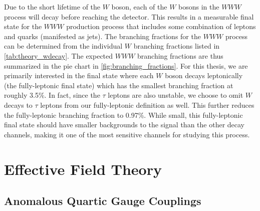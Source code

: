 Due to the short lifetime of the $W$ boson, each of the $W$ bosons
in the $WWW$ process will decay before reaching the detector.
This results in a measurable final state for the $WWW$ production 
process that includes some combination of leptons 
and quarks (manifested as jets).  The branching fractions for 
the $WWW$ process can be determined from the individual $W$ branching fractions
listed in \tab\ref{tab:theory_wdecay}.  The expected $WWW$ branching
fractions are thus summarized in the pie chart in \fig\ref{fig:branching_fractions}.
For this thesis, we are primarily interested in the final state
where each $W$ boson decays leptonically (the fully-leptonic final state) 
which has the smallest branching fraction at roughly 3.5\%.
In fact, since the $\tau$ leptons are also unstable, we choose to 
omit $W$ decays to $\tau$ leptons from our fully-leptonic
definition as well. This further reduces the fully-leptonic 
branching fraction to 0.97\%.  While small, this fully-leptonic final state
should have smaller backgrounds to the signal than the other 
decay channels, making it one of the most sensitive channels for studying
this process.


\section{Effective Field Theory}
\subsection{Anomalous Quartic Gauge Couplings}

